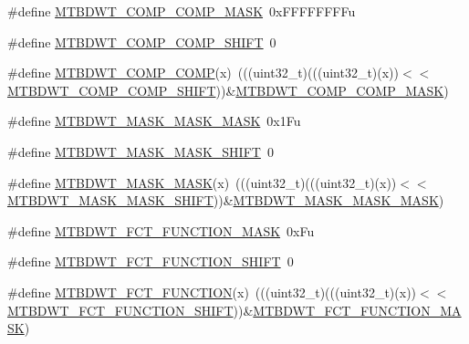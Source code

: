 \begin{DoxyCompactItemize}
\item 
\#define \hyperlink{group___m_t_b_d_w_t___register___masks_ga95b185cf8a19b80b863058a837c0978d}{M\+T\+B\+D\+W\+T\+\_\+\+C\+O\+M\+P\+\_\+\+C\+O\+M\+P\+\_\+\+M\+A\+SK}~0x\+F\+F\+F\+F\+F\+F\+F\+Fu
\item 
\#define \hyperlink{group___m_t_b_d_w_t___register___masks_ga0ec26e5cefc95dac603a0b03b1ad0fdd}{M\+T\+B\+D\+W\+T\+\_\+\+C\+O\+M\+P\+\_\+\+C\+O\+M\+P\+\_\+\+S\+H\+I\+FT}~0
\item 
\#define \hyperlink{group___m_t_b_d_w_t___register___masks_ga1c3d552767450157531a7ef5e1d02731}{M\+T\+B\+D\+W\+T\+\_\+\+C\+O\+M\+P\+\_\+\+C\+O\+MP}(x)~(((uint32\+\_\+t)(((uint32\+\_\+t)(x))$<$$<$\hyperlink{group___m_t_b_d_w_t___register___masks_ga0ec26e5cefc95dac603a0b03b1ad0fdd}{M\+T\+B\+D\+W\+T\+\_\+\+C\+O\+M\+P\+\_\+\+C\+O\+M\+P\+\_\+\+S\+H\+I\+FT}))\&\hyperlink{group___m_t_b_d_w_t___register___masks_ga95b185cf8a19b80b863058a837c0978d}{M\+T\+B\+D\+W\+T\+\_\+\+C\+O\+M\+P\+\_\+\+C\+O\+M\+P\+\_\+\+M\+A\+SK})
\item 
\#define \hyperlink{group___m_t_b_d_w_t___register___masks_gaa4fcad7c638af9ad4f678c9b02fe083e}{M\+T\+B\+D\+W\+T\+\_\+\+M\+A\+S\+K\+\_\+\+M\+A\+S\+K\+\_\+\+M\+A\+SK}~0x1\+Fu
\item 
\#define \hyperlink{group___m_t_b_d_w_t___register___masks_ga2ebeb9592fd6b0121c2e3729f5afd2ff}{M\+T\+B\+D\+W\+T\+\_\+\+M\+A\+S\+K\+\_\+\+M\+A\+S\+K\+\_\+\+S\+H\+I\+FT}~0
\item 
\#define \hyperlink{group___m_t_b_d_w_t___register___masks_ga3ac9e2ec6bbab5088938f5dcdd2f76db}{M\+T\+B\+D\+W\+T\+\_\+\+M\+A\+S\+K\+\_\+\+M\+A\+SK}(x)~(((uint32\+\_\+t)(((uint32\+\_\+t)(x))$<$$<$\hyperlink{group___m_t_b_d_w_t___register___masks_ga2ebeb9592fd6b0121c2e3729f5afd2ff}{M\+T\+B\+D\+W\+T\+\_\+\+M\+A\+S\+K\+\_\+\+M\+A\+S\+K\+\_\+\+S\+H\+I\+FT}))\&\hyperlink{group___m_t_b_d_w_t___register___masks_gaa4fcad7c638af9ad4f678c9b02fe083e}{M\+T\+B\+D\+W\+T\+\_\+\+M\+A\+S\+K\+\_\+\+M\+A\+S\+K\+\_\+\+M\+A\+SK})
\item 
\#define \hyperlink{group___m_t_b_d_w_t___register___masks_ga05376c97e9f6d9af8d411be187d45d4c}{M\+T\+B\+D\+W\+T\+\_\+\+F\+C\+T\+\_\+\+F\+U\+N\+C\+T\+I\+O\+N\+\_\+\+M\+A\+SK}~0x\+Fu
\item 
\#define \hyperlink{group___m_t_b_d_w_t___register___masks_gae855270584ab08b726fd88c288d2e605}{M\+T\+B\+D\+W\+T\+\_\+\+F\+C\+T\+\_\+\+F\+U\+N\+C\+T\+I\+O\+N\+\_\+\+S\+H\+I\+FT}~0
\item 
\#define \hyperlink{group___m_t_b_d_w_t___register___masks_ga14d63a7f56cfa9813f635e1bf3b2d1b0}{M\+T\+B\+D\+W\+T\+\_\+\+F\+C\+T\+\_\+\+F\+U\+N\+C\+T\+I\+ON}(x)~(((uint32\+\_\+t)(((uint32\+\_\+t)(x))$<$$<$\hyperlink{group___m_t_b_d_w_t___register___masks_gae855270584ab08b726fd88c288d2e605}{M\+T\+B\+D\+W\+T\+\_\+\+F\+C\+T\+\_\+\+F\+U\+N\+C\+T\+I\+O\+N\+\_\+\+S\+H\+I\+FT}))\&\hyperlink{group___m_t_b_d_w_t___register___masks_ga05376c97e9f6d9af8d411be187d45d4c}{M\+T\+B\+D\+W\+T\+\_\+\+F\+C\+T\+\_\+\+F\+U\+N\+C\+T\+I\+O\+N\+\_\+\+M\+A\+SK})
$$
\end{DoxyCompactItemize}

